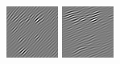\begin{figure}[ht]
\begin{center}
  \includegraphics[width=\columnwidth/9]{ch4/figures/real_-1_2.jpg}
  \includegraphics[width=\columnwidth/9]{ch4/figures/real_-1_3.jpg}

\end{center}
\end{figure}
